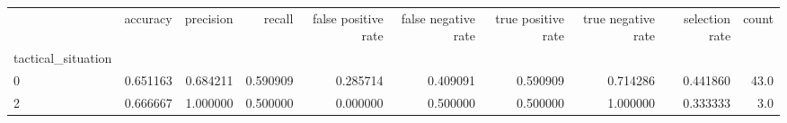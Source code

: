 \begin{tabular}{lrrrrrrrrr}
\toprule
{} &  accuracy &  precision &    recall &  false positive rate &  false negative rate &  true positive rate &  true negative rate &  selection rate &  count \\
tactical\_situation &           &            &           &                      &                      &                     &                     &                 &        \\
\midrule
0                  &  0.651163 &   0.684211 &  0.590909 &             0.285714 &             0.409091 &            0.590909 &            0.714286 &        0.441860 &   43.0 \\
2                  &  0.666667 &   1.000000 &  0.500000 &             0.000000 &             0.500000 &            0.500000 &            1.000000 &        0.333333 &    3.0 \\
\bottomrule
\end{tabular}
